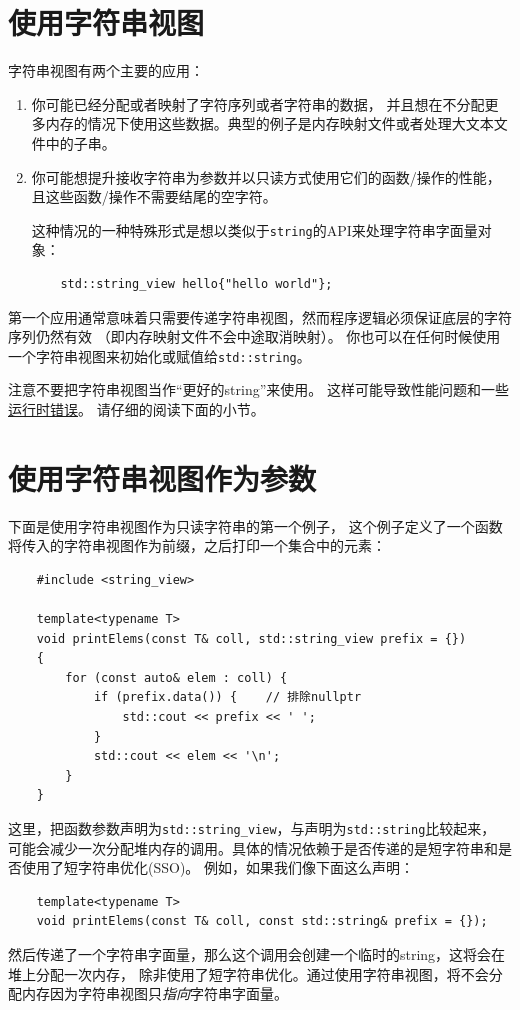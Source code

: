 \section{使用字符串视图}
字符串视图有两个主要的应用：
\begin{enumerate}
    \item 你可能已经分配或者映射了字符序列或者字符串的数据，
    并且想在不分配更多内存的情况下使用这些数据。典型的例子是内存映射文件或者处理大文本文件中的子串。
    \item 你可能想提升接收字符串为参数并以只读方式使用它们的函数/操作的性能，且这些函数/操作不需要结尾的空字符。

    这种情况的一种特殊形式是想以类似于\texttt{string}的API来处理字符串字面量对象：
    \begin{lstlisting}
    std::string_view hello{"hello world"};
    \end{lstlisting}
\end{enumerate}
第一个应用通常意味着只需要传递字符串视图，然而程序逻辑必须保证底层的字符序列仍然有效
（即内存映射文件不会中途取消映射）。
你也可以在任何时候使用一个字符串视图来初始化或赋值给\texttt{std::string}。

注意不要把字符串视图当作“更好的string”来使用。
这样可能导致性能问题和一些\hyperref[ch19.3.1]{运行时错误}。
请仔细的阅读下面的小节。


\section{使用字符串视图作为参数}
下面是使用字符串视图作为只读字符串的第一个例子，
这个例子定义了一个函数将传入的字符串视图作为前缀，之后打印一个集合中的元素：
\begin{lstlisting}
    #include <string_view>

    template<typename T>
    void printElems(const T& coll, std::string_view prefix = {})
    {
        for (const auto& elem : coll) {
            if (prefix.data()) {    // 排除nullptr
                std::cout << prefix << ' ';
            }
            std::cout << elem << '\n';
        }
    }
\end{lstlisting}
这里，把函数参数声明为\texttt{std::string\_view}，与声明为\texttt{std::string}比较起来，
可能会减少一次分配堆内存的调用。具体的情况依赖于是否传递的是短字符串和是否使用了短字符串优化(SSO)。
例如，如果我们像下面这么声明：
\begin{lstlisting}
    template<typename T>
    void printElems(const T& coll, const std::string& prefix = {});
\end{lstlisting}
然后传递了一个字符串字面量，那么这个调用会创建一个临时的string，这将会在堆上分配一次内存，
除非使用了短字符串优化。通过使用字符串视图，将不会分配内存因为字符串视图只\emph{指向}字符串字面量。

